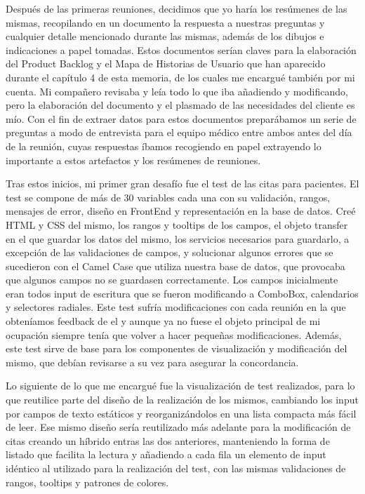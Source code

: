 Después de las primeras reuniones, decidimos que yo haría los resúmenes de las mismas, recopilando en un documento la respuesta a nuestras preguntas y cualquier detalle mencionado durante las mismas, además de los dibujos e indicaciones a papel tomadas. Estos documentos serían claves para la elaboración del Product Backlog y el Mapa de Historias de Usuario que han aparecido durante el capítulo 4 de esta memoria, de los cuales me encargué también por mi cuenta. Mi compañero revisaba y leía todo lo que iba añadiendo y modificando, pero la elaboración del documento y el plasmado de las necesidades del cliente es mío. Con el fin de extraer datos para estos documentos preparábamos un serie de preguntas a modo de entrevista para el equipo médico entre ambos antes del día de la reunión, cuyas respuestas íbamos recogiendo en papel extrayendo lo importante a estos artefactos y los resúmenes de reuniones.\newline

Tras estos inicios, mi primer gran desafío fue el test de las citas para pacientes. El test se compone de más de 30 variables cada una con su validación, rangos, mensajes de error, diseño en FrontEnd y representación en la base de datos. Creé HTML y CSS del mismo, los rangos y tooltips de los campos, el objeto transfer en el que guardar los datos del mismo, los servicios necesarios para guardarlo, a excepción de las validaciones de campos, y solucionar algunos errores que se sucedieron con el Camel Case que utiliza nuestra base de datos, que provocaba que algunos campos no se guardasen correctamente. Los campos inicialmente eran todos input de escritura que se fueron modificando a ComboBox, calendarios y selectores radiales. Este test sufría modificaciones con cada reunión en la que obteníamos feedback de el y aunque ya no fuese el objeto principal de mi ocupación siempre tenía que volver a hacer pequeñas modificaciones. Además, este test sirve de base para los componentes de visualización y modificación del mismo, que debían revisarse a su vez para asegurar la concordancia.\newline

Lo siguiente de lo que me encargué fue la visualización de test realizados, para lo que reutilice parte del diseño de la realización de los mismos, cambiando los input por campos de texto estáticos y reorganizándolos en una lista compacta más fácil de leer. Ese mismo diseño sería reutilizado más adelante para la modificación de citas creando un híbrido entras las dos anteriores, manteniendo la forma de listado que facilita la lectura y añadiendo a cada fila un elemento de input idéntico al utilizado para la realización del test, con las mismas validaciones de rangos, tooltips y patrones de colores.\newline

